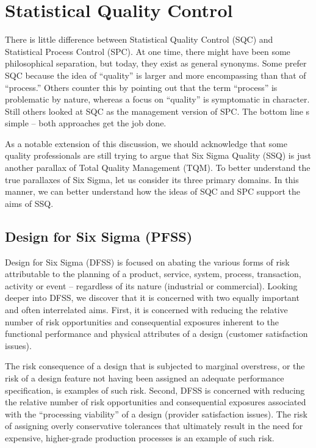 \documentclass[11pt]{article} %
\begin{document}
\tableofcontents


\section{Statistical Quality Control}
There is little difference between Statistical Quality Control (SQC) and Statistical Process Control (SPC).  At one time, there might have been some philosophical separation, but today, they exist as general synonyms.  Some prefer SQC because the idea of “quality” is larger and more encompassing than that of “process.”  Others counter this by pointing out that the term “process” is problematic by nature, whereas a focus on “quality” is symptomatic in character.  Still others looked at SQC as the management version of SPC.  The bottom line s simple – both approaches get the job done.

As a notable extension of this discussion, we should acknowledge that some quality professionals are still trying to argue that Six Sigma Quality (SSQ) is just another parallax of Total Quality Management (TQM).  To better understand the true parallaxes of Six Sigma, let us consider its three primary domains.  In this manner, we can better understand how the ideas of SQC and SPC support the aims of SSQ.

\subsection{Design for Six Sigma (PFSS)}
Design for Six Sigma (DFSS) is focused on abating the various forms of risk attributable to the planning of a product, service, system, process, transaction, activity or event – regardless of its nature (industrial or commercial). Looking deeper into DFSS, we discover that it is concerned with two equally important and often interrelated aims.  First, it is concerned with reducing the relative number of risk opportunities and consequential exposures inherent to the functional performance and physical attributes of a design (customer satisfaction issues).  


The risk consequence of a design that is subjected to marginal overstress, or the risk of a design feature not having been assigned an adequate performance specification, is examples of such risk.  Second, DFSS is concerned with reducing the relative number of risk opportunities and consequential exposures associated with the “processing viability” of a design (provider satisfaction issues).  The risk of assigning overly conservative tolerances that ultimately result in the need for expensive, higher-grade production processes is an example of such risk.
\end{document}
